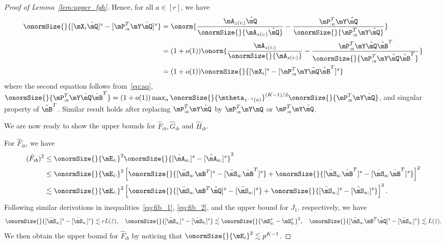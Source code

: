 \documentclass[lettersize,onecolumn,journal]{IEEEtran}
\theoremstyle{definition}
\theoremstyle{definition}
\newcommand{\off}[1]{\left[#1\right]}
\begin{document}
\begin{proof}[Proof of Lemma~\ref{lem:upper_fgh}]
{Hence, for all $a \in [r]$, we have 
\begin{align}
    \onormSize{}{ [\mX_i \hat \mQ]^s - [\mP_{:a}^T \mY \hat \mQ ]^s } &= \onorm{ \frac{\mA_{z(i:)} \hat \mQ  }{\onormSize{}{\mA_{z(i:)} \hat \mQ }} - \frac{\mP_{:a}^T \mY \hat \mQ  }{ \onormSize{}{\mP_{:a}^T \mY \hat \mQ} } } \\
    &= (1+o(1))  \onorm{ \frac{\mA_{z(i:)} }{\onormSize{}{\mA_{z(i:)} }} - \frac{\mP_{:a}^T \mY \hat \mQ \hat \mB^T  }{ \onormSize{}{\mP_{:a}^T \mY \hat \mQ \hat \mB^T} } } \\
    &= (1+o(1)) \onormSize{}{ [\mX_i]^s - [\mP_{:a}^T \mY \hat \mQ \hat \mB^T ]^s } \label{eq:angle_aq}
\end{align}
where the second equation follows from~\eqref{eq:aq}, $\onormSize{}{\mP_{:a}^T \mY \hat \mQ \hat \mB^T} = (1 + o(1)) \max_{a} \onormSize{}{\mtheta_{z^{-1}(a)}}^{(K-1)/2} \onormSize{}{\mP_{:a}^T \mY \hat \mQ } $, and singular property of $\hat \mB^T$. Similar result holds after replacing $\mP_{:a}^T \mY \hat \mQ$ by  $\mP_{:a}^T \mY\mQ$ or $\mP_{:a}^T \mY \hat \mQ$.

We are now ready to show the upper bounds for $\hat F_{ib},\hat G_{ib}$ and $\hat H_{ib}$.

 For $\hat F_{ib}$, we have 
\begin{align}
    (\hat F_{ib})^2 &\leq \onormSize{}{\mE_{i:}}^2 \onormSize{}{ [\bar  \mA_{a:}]^s - [\hat \mA_{a:}]^s }^2\\
    &\leq \onormSize{}{\mE_{i:}}^2  \off{ \onormSize{}{ [ \bar \mS_{a:} \mB^T]^s - [\bar \mS_{a:} \hat \mB^T]^s } +  \onormSize{}{ [ \bar \mS_{a:} \hat \mB^T]^s -  [\hat \mS_{a:} \hat \mB^T]^s}  }^2 \\
    &\lesssim \onormSize{}{\mE_{i:}}^2  \off{ \onormSize{}{ [ \bar \mS_{a:} \mB^T \hat \mQ]^s - [\bar \mS_{a:}]^s } +  \onormSize{}{ [ \bar \mS_{a:} ]^s -  [ \hat \mS_{a:} ]^s}  }^2.
\end{align}
Following similar derivations in inequalities~\eqref{eq:fib_1}, \eqref{eq:fib_2}, and the upper bound for $J_{1}$, respectively, we have 
\begin{equation}
    \onormSize{}{ [ \bar \mS_{a:} ]^s -  [ \hat \mS_{a:} ]^s}  \lesssim r L(\hat z), \quad  \onormSize{}{ [ \bar \mS_{a:} ]^s -  [ \bar \mS_{b:} ]^s} \lesssim \onormSize{}{\mS_{a:}^s - \mS_{b:}^s}^2, \quad  \onormSize{}{ [ \bar \mS_{a:} \mB^T \hat \mQ]^s - [\bar \mS_{a:}]^s } \lesssim L(\hat z).
\end{equation}
We then obtain the upper bound for $\hat F_{ib}$ by noticing that $\onormSize{}{\mE_i}^2 \lesssim p^{K-1}$.

}
\end{proof}
\end{document}
